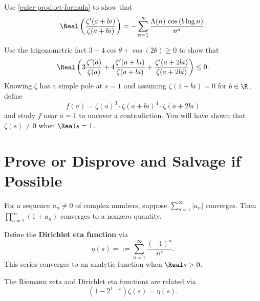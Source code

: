\documentclass{homework}
\begin{document}
\begin{problem}
  Use \ref{euler-product-formula} to show that
  \[
    \Real \left( \frac{ \zeta'(a+bi) }{ \zeta(a+bi) } \right) = - \sum_{n=1}^\infty \frac{\Lambda(n) \, \cos \left( b \log n \right)}{n^{a}}.
  \]
\end{problem}

\begin{problem}
  Use the trigonometric fact $3 + 4 \cos \theta + \cos (2\theta) \geq 0$ to show that
  \[
    \Real \left( 3 \frac{ \zeta'(a) }{ \zeta(a) } + 4 \frac{ \zeta'(a+bi) }{ \zeta(a+bi) } +  \frac{ \zeta'(a+2bi) }{ \zeta(a+2bi) } \right) \leq 0.
  \]
  Knowing $\zeta$ has a simple pole at $s = 1$ and assuming
  $\zeta(1+bi) = 0$ for $b \in \R$, define 
  \[
    f(a) = \zeta(a)^3 \cdot \zeta(a+bi)^4 \cdot \zeta(a + 2bi)
  \]
  and study $f$ near $a = 1$ to uncover a contradiction.  You will
  have shown that $\zeta(s) \neq 0$ when $\Real s = 1$.
\end{problem}

\section{Prove or Disprove and Salvage if Possible}

\begin{problem}\label{nonzero-infinite-product}For a sequence $a_n \neq 0$ of complex numbers, suppose
  $\displaystyle\sum_{n=1}^\infty |a_n|$ converges.  Then
  $\displaystyle\prod_{n=1}^\infty \left( 1 + a_n \right)$ converges
  to a nonzero quantity.
\end{problem}

\begin{problem} %
  Define the \textbf{Dirichlet eta function} via
  \[
    \eta(s) = := \sum_{n=1}^\infty \frac{(-1)^n}{n^s}.
  \]
  This series converges to an analytic function when $\Real s > 0$.
\end{problem}

\begin{problem}
  The Riemann zeta and Dirichlet eta functions are related via
  \[
    \left( 1 - 2^{1-s} \right) \zeta(s) = \eta(s).
  \]
\end{problem}
\end{document}
